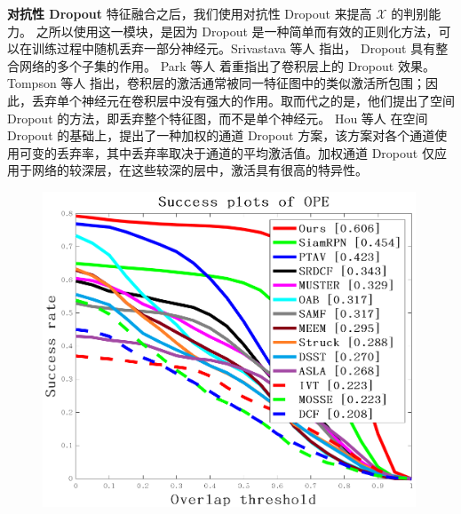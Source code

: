 \textbf{对抗性 Dropout} 特征融合之后，我们使用对抗性 Dropout \cite{park2018adversarial, lee2019drop} 来提高 $\mathcal{X}$ 的判别能力。
之所以使用这一模块，是因为 Dropout 是一种简单而有效的正则化方法，可以在训练过程中随机丢弃一部分神经元。Srivastava 等人 \cite{srivastava2014dropout} 指出， Dropout 具有整合网络的多个子集的作用。 Park 等人 \cite{park2016analysis} 着重指出了卷积层上的 Dropout 效果。Tompson 等人 \cite{tompson2015efficient} 指出，卷积层的激活通常被同一特征图中的类似激活所包围；因此，丢弃单个神经元在卷积层中没有强大的作用。取而代之的是，他们提出了空间 Dropout 的方法，即丢弃整个特征图，而不是单个神经元。 Hou 等人 \cite{hou2019weighted} 在空间 Dropout 的基础上，提出了一种加权的通道 Dropout 方案，该方案对各个通道使用可变的丢弃率，其中丢弃率取决于通道的平均激活值。加权通道 Dropout 仅应用于网络的较深层，在这些较深的层中，激活具有很高的特异性。
\begin{figure}[t]
\begin{minipage}{0.48\textwidth}
  \centering
  \centerline{\includegraphics[width=0.99\textwidth]{Img/end/quality_plot_overlap_OPE_AUC.png}}
\end{minipage}
\hfill
\begin{minipage}{0.48\textwidth}
  \centering

\end{minipage}
\end{figure}

